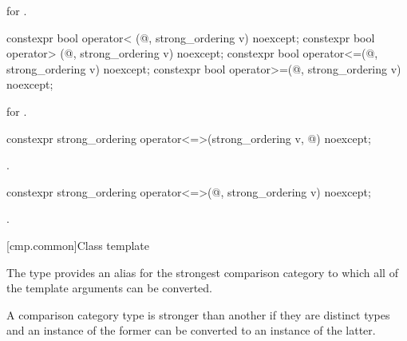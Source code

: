 \begin{itemdescr}
\pnum
\returns
{} for .
\end{itemdescr}

%
%
%
%
\begin{itemdecl}
constexpr bool operator< (@\unspec@, strong_ordering v) noexcept;
constexpr bool operator> (@\unspec@, strong_ordering v) noexcept;
constexpr bool operator<=(@\unspec@, strong_ordering v) noexcept;
constexpr bool operator>=(@\unspec@, strong_ordering v) noexcept;
\end{itemdecl}

\begin{itemdescr}
\pnum
\returns
{} for .
\end{itemdescr}

%
\begin{itemdecl}
constexpr strong_ordering operator<=>(strong_ordering v, @\unspec@) noexcept;
\end{itemdecl}

\begin{itemdescr}
\pnum
\returns
{}.
\end{itemdescr}

%
\begin{itemdecl}
constexpr strong_ordering operator<=>(@\unspec@, strong_ordering v) noexcept;
\end{itemdecl}

\begin{itemdescr}
\pnum
\returns
{}.
\end{itemdescr}

[cmp.common]{Class template }

\pnum
The type  provides an alias for
the strongest comparison category
to which all of the template arguments can be converted.
\begin{note}
A comparison category type is stronger than another if
they are distinct types and an instance of the former
can be converted to an instance of the latter.
\end{note}

